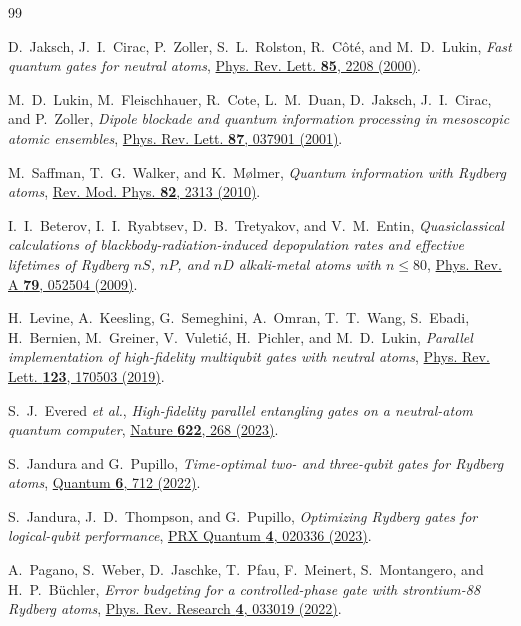 \documentclass[aps,prx,reprint,nofootinbib,longbibliography,floatfix]{revtex4-2}
\theoremstyle{plain}
\theoremstyle{remark}
\begin{document}
\begin{thebibliography}{99}

D.~Jaksch, J.~I.~Cirac, P.~Zoller, S.~L.~Rolston, R.~C{\^o}t{\'e}, and M.~D.~Lukin,
\emph{Fast quantum gates for neutral atoms},
\href{https://doi.org/10.1103/PhysRevLett.85.2208}{Phys. Rev. Lett. \textbf{85}, 2208 (2000)}.

M.~D.~Lukin, M.~Fleischhauer, R.~Cote, L.~M.~Duan, D.~Jaksch, J.~I.~Cirac, and P.~Zoller,
\emph{Dipole blockade and quantum information processing in mesoscopic atomic ensembles},
\href{https://doi.org/10.1103/PhysRevLett.87.037901}{Phys. Rev. Lett. \textbf{87}, 037901 (2001)}.

M.~Saffman, T.~G.~Walker, and K.~M{\o}lmer,
\emph{Quantum information with Rydberg atoms},
\href{https://doi.org/10.1103/RevModPhys.82.2313}{Rev. Mod. Phys. \textbf{82}, 2313 (2010)}.

I.~I.~Beterov, I.~I.~Ryabtsev, D.~B.~Tretyakov, and V.~M.~Entin,
\emph{Quasiclassical calculations of blackbody-radiation-induced depopulation rates and effective lifetimes of Rydberg $nS$, $nP$, and $nD$ alkali-metal atoms with $n\le 80$},
\href{https://doi.org/10.1103/PhysRevA.79.052504}{Phys. Rev. A \textbf{79}, 052504 (2009)}.

H.~Levine, A.~Keesling, G.~Semeghini, A.~Omran, T.~T.~Wang, S.~Ebadi, H.~Bernien, M.~Greiner, V.~Vuleti{\'c}, H.~Pichler, and M.~D.~Lukin,
\emph{Parallel implementation of high-fidelity multiqubit gates with neutral atoms},
\href{https://doi.org/10.1103/PhysRevLett.123.170503}{Phys. Rev. Lett. \textbf{123}, 170503 (2019)}.

S.~J.~Evered \emph{et al.},
\emph{High-fidelity parallel entangling gates on a neutral-atom quantum computer},
\href{https://doi.org/10.1038/s41586-023-06481-y}{Nature \textbf{622}, 268 (2023)}.

S.~Jandura and G.~Pupillo,
\emph{Time-optimal two- and three-qubit gates for Rydberg atoms},
\href{https://doi.org/10.22331/q-2022-05-13-712}{Quantum \textbf{6}, 712 (2022)}.

S.~Jandura, J.~D.~Thompson, and G.~Pupillo,
\emph{Optimizing Rydberg gates for logical-qubit performance},
\href{https://doi.org/10.1103/PRXQuantum.4.020336}{PRX Quantum \textbf{4}, 020336 (2023)}.

A.~Pagano, S.~Weber, D.~Jaschke, T.~Pfau, F.~Meinert, S.~Montangero, and H.~P.~B{\"u}chler,
\emph{Error budgeting for a controlled-phase gate with strontium-88 Rydberg atoms},
\href{https://doi.org/10.1103/PhysRevResearch.4.033019}{Phys. Rev. Research \textbf{4}, 033019 (2022)}.


\end{thebibliography}
\end{document}
